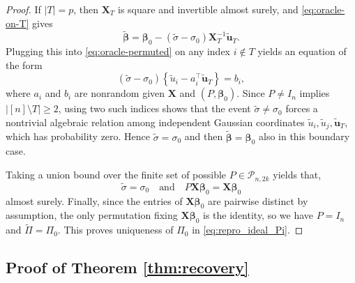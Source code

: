 \documentclass[11pt, reqno]{amsart}
\renewcommand{\tilde}{\widetilde}
\renewcommand{\ge}{\geqslant}
\newcommand{\mP}{\mathcal{P}}
\newcommand{\1}{\mbox{1}\hspace{-0.25em}\mbox{l}}
\theoremstyle{definition}\newtheorem{problem}{Problem}[section]
\theoremstyle{definition}\newtheorem{definition}[problem]{Definition}
\theoremstyle{remark}\newtheorem{assumption}{Assumption}
\theoremstyle{remark}\newtheorem{remark}[problem]{Remark}
\theoremstyle{definition}\newtheorem{example}[problem]{Example}
\theoremstyle{plain}\newtheorem{theorem}[problem]{Theorem}
\theoremstyle{plain}\newtheorem{question}[problem]{Question}
\theoremstyle{plain}\newtheorem{lemma}[problem]{Lemma}
\theoremstyle{plain}\newtheorem{proposition}[problem]{Proposition}
\theoremstyle{plain}\newtheorem{corollary}[problem]{Corollary}
\theoremstyle{plain}\newtheorem{conjecture}[problem]{Conjecture}
\begin{document}
\begin{proof}
If $|T|=p$, then $\bm X_T$ is square and invertible almost surely, and \eqref{eq:oracle-on-T} gives
\[
\tilde{\bm\beta}=\bm\beta_0-(\tilde\sigma-\sigma_0)\bm X_T^{-1}\tilde{\bm u}_T.
\]
Plugging this into \eqref{eq:oracle-permuted} on any index $i\notin T$ yields an equation of the form
\[
(\tilde\sigma-\sigma_0)\left\{\tilde u_i-a_i^\top \tilde{\bm u}_T\right\}=b_i,
\]
where $a_i$ and $b_i$ are nonrandom given $\bm X$ and $(P,\bm\beta_0)$.
Since $P\neq I_n$ implies $|[n]\setminus T|\ge 2$, using two such indices shows that the event
$\tilde\sigma\ne\sigma_0$ forces a nontrivial algebraic relation among independent Gaussian coordinates
$\tilde u_i,\tilde u_j,\tilde{\bm u}_T$, which has probability zero. Hence $\tilde\sigma=\sigma_0$ and then
$\tilde{\bm\beta}=\bm\beta_0$ also in this boundary case.

Taking a union bound over the finite set of possible $P\in\mP_{n,2k}$ yields that,
\[
\tilde\sigma=\sigma_0
\quad\text{and}\quad
P\bm X\bm\beta_0=\bm X\bm\beta_0
\]
almost surely. Finally, since the entries of $\bm X\bm\beta_0$ are pairwise distinct by assumption,
the only permutation fixing $\bm X\bm\beta_0$ is the identity, so we have $P=I_n$ and $\tilde\Pi=\Pi_0$.
This proves uniqueness of $\Pi_0$ in \eqref{eq:repro_ideal_Pi}.
\end{proof}

\subsection{Proof of Theorem \ref{thm:recovery}}
\end{document}

